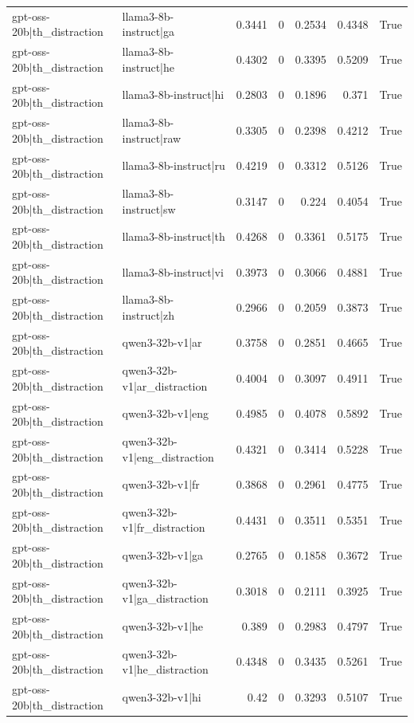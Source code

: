 \begin{table}
\begin{tabular}{l l r r r r l}
gpt-oss-20b|th_distraction & llama3-8b-instruct|ga & 0.3441 & 0 & 0.2534 & 0.4348 & True \\
gpt-oss-20b|th_distraction & llama3-8b-instruct|he & 0.4302 & 0 & 0.3395 & 0.5209 & True \\
gpt-oss-20b|th_distraction & llama3-8b-instruct|hi & 0.2803 & 0 & 0.1896 & 0.371 & True \\
gpt-oss-20b|th_distraction & llama3-8b-instruct|raw & 0.3305 & 0 & 0.2398 & 0.4212 & True \\
gpt-oss-20b|th_distraction & llama3-8b-instruct|ru & 0.4219 & 0 & 0.3312 & 0.5126 & True \\
gpt-oss-20b|th_distraction & llama3-8b-instruct|sw & 0.3147 & 0 & 0.224 & 0.4054 & True \\
gpt-oss-20b|th_distraction & llama3-8b-instruct|th & 0.4268 & 0 & 0.3361 & 0.5175 & True \\
gpt-oss-20b|th_distraction & llama3-8b-instruct|vi & 0.3973 & 0 & 0.3066 & 0.4881 & True \\
gpt-oss-20b|th_distraction & llama3-8b-instruct|zh & 0.2966 & 0 & 0.2059 & 0.3873 & True \\
gpt-oss-20b|th_distraction & qwen3-32b-v1|ar & 0.3758 & 0 & 0.2851 & 0.4665 & True \\
gpt-oss-20b|th_distraction & qwen3-32b-v1|ar_distraction & 0.4004 & 0 & 0.3097 & 0.4911 & True \\
gpt-oss-20b|th_distraction & qwen3-32b-v1|eng & 0.4985 & 0 & 0.4078 & 0.5892 & True \\
gpt-oss-20b|th_distraction & qwen3-32b-v1|eng_distraction & 0.4321 & 0 & 0.3414 & 0.5228 & True \\
gpt-oss-20b|th_distraction & qwen3-32b-v1|fr & 0.3868 & 0 & 0.2961 & 0.4775 & True \\
gpt-oss-20b|th_distraction & qwen3-32b-v1|fr_distraction & 0.4431 & 0 & 0.3511 & 0.5351 & True \\
gpt-oss-20b|th_distraction & qwen3-32b-v1|ga & 0.2765 & 0 & 0.1858 & 0.3672 & True \\
gpt-oss-20b|th_distraction & qwen3-32b-v1|ga_distraction & 0.3018 & 0 & 0.2111 & 0.3925 & True \\
gpt-oss-20b|th_distraction & qwen3-32b-v1|he & 0.389 & 0 & 0.2983 & 0.4797 & True \\
gpt-oss-20b|th_distraction & qwen3-32b-v1|he_distraction & 0.4348 & 0 & 0.3435 & 0.5261 & True \\
gpt-oss-20b|th_distraction & qwen3-32b-v1|hi & 0.42 & 0 & 0.3293 & 0.5107 & True \\

\end{tabular}
\end{table}
